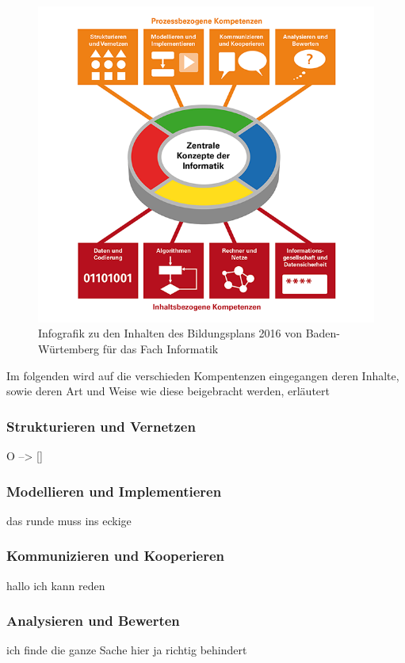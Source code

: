 \begin{figure}[ht]
	\centering
	\includegraphics[width=\textwidth,height=\textheight,keepaspectratio]{images/BildungsplanInformatik.png}
	\caption{Infografik zu den Inhalten des Bildungsplans 2016 von Baden-Würtemberg für das Fach Informatik}
	\label{Bildungsplan Infromatik Infografik}
\end{figure}

Im folgenden wird auf die verschieden Kompentenzen eingegangen deren Inhalte, sowie deren Art und Weise wie diese beigebracht werden, erläutert

\subsubsection{Strukturieren und Vernetzen}
O --> []

\subsubsection{Modellieren und Implementieren}
das runde muss ins eckige

\subsubsection{Kommunizieren und Kooperieren}
hallo ich kann reden

\subsubsection{Analysieren und Bewerten}
ich finde die ganze Sache hier ja richtig behindert

